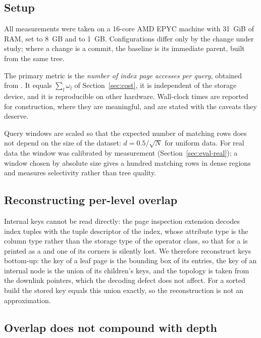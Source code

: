 \subsection{Setup}

All measurements were taken on a 16-core AMD EPYC machine with 31~GiB of RAM,
 set to 8~GB and  to 1~GB.
Configurations differ only by the change under study; where a change is a commit,
the baseline is its immediate parent, built from the same tree.

The primary metric is the \emph{number of index page accesses per query},
obtained from . It equals $\sum_l \omega_l$ of
Section~\ref{sec:cost}, it is independent of the storage device, and it is
reproducible on other hardware. Wall-clock times are reported for construction,
where they are meaningful, and are stated with the caveats they deserve.

Query windows are scaled so that the expected number of matching rows does not
depend on the size of the dataset: $d = 0.5/\sqrt{N}$ for uniform data. For real
data the window was calibrated by measurement (Section~\ref{sec:eval-real}); a
window chosen by absolute size gives a hundred matching rows in dense regions
and measures selectivity rather than tree quality.

\subsection{Reconstructing per-level overlap}

Internal keys cannot be read directly: the page inspection extension decodes
index tuples with the tuple descriptor of the index, whose attribute type is the
column type rather than the storage type of the operator class, so that for
 a  is printed as a  and one of its
corners is silently lost. We therefore reconstruct keys bottom-up: the key of a
leaf page is the bounding box of its entries, the key of an internal node is the
union of its children's keys, and the topology is taken from the downlink
pointers, which the decoding defect does not affect. For a sorted build the
stored key equals this union exactly, so the reconstruction is not an
approximation.

\subsection{Overlap does not compound with depth}

